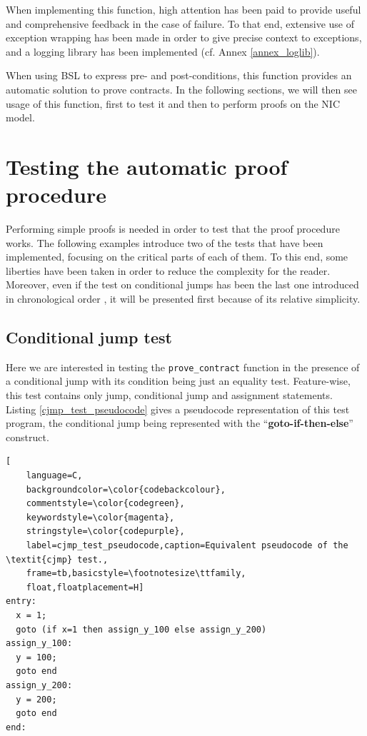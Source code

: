 \documentclass{kththesis}
\begin{document}

When implementing this function, high attention has been paid to provide useful and comprehensive feedback in the case of failure. To that end, extensive use of exception wrapping has been made in order to give precise context to exceptions, and a logging library has been implemented (cf. Annex \ref{annex_loglib}).

When using \gls{BSL} to express pre- and post-conditions, this function provides an automatic solution to prove contracts. In the following sections, we will then see usage of this function, first to test it and then to perform proofs on the NIC model.

\section{Testing the automatic proof procedure}

Performing simple proofs is needed in order to test that the proof procedure works. The following examples introduce two of the tests that have been implemented, focusing on the critical parts of each of them. To this end, some liberties have been taken in order to reduce the complexity for the reader. Moreover, even if the test on conditional jumps has been the last one introduced in chronological order \footnotemark, it will be presented first because of its relative simplicity.


\subsection{Conditional jump test} \label{cjmp_test}

Here we are interested in testing the \texttt{prove\_contract} function in the presence of a conditional jump with its condition being just an equality test. Feature-wise, this test contains only jump, conditional jump and assignment statements. Listing \ref{cjmp_test_pseudocode} gives a pseudocode representation of this test program, the conditional jump being represented with the ``\textbf{goto-if-then-else}'' construct.

\begin{lstlisting}[
    language=C,
    backgroundcolor=\color{codebackcolour},
    commentstyle=\color{codegreen},
    keywordstyle=\color{magenta},
    stringstyle=\color{codepurple},
    label=cjmp_test_pseudocode,caption=Equivalent pseudocode of the \textit{cjmp} test.,
    frame=tb,basicstyle=\footnotesize\ttfamily,
    float,floatplacement=H]
entry:
  x = 1;
  goto (if x=1 then assign_y_100 else assign_y_200)
assign_y_100:
  y = 100;
  goto end
assign_y_200:
  y = 200;
  goto end
end:
\end{lstlisting}
\end{document}

